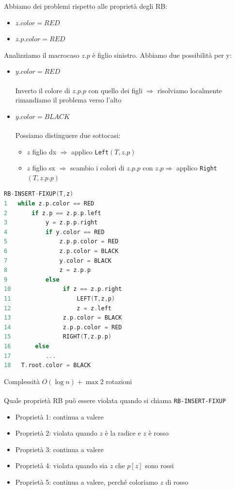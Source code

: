 Abbiamo dei problemi rispetto alle proprietà degli RB:
\begin{itemize}
    \item $z.color = RED$
    \item $z.p.color = RED$
\end{itemize}
Analizziamo il macrocaso $z.p$ è figlio sinistro. Abbiamo due possibilità per y:
\begin{itemize}
    \item $y.color = RED$ \\~\\ Inverto il colore di $z.p.p$ con quello dei figli $\Rightarrow$ risolviamo localmente rimandiamo il problema verso l'alto
    \item $y.color = BLACK$ \\~\\ Possiamo distinguere due sottocasi:
    \begin{itemize}
        \item $z$ figlio dx $\Rightarrow$ applico \verb|Left|$(T,z.p)$
        \item $z$ figlio sx $\Rightarrow$ scambio i colori di $z.p.p$ con $z.p \Rightarrow$ applico \verb|Right|$(T,z.p.p)$
    \end{itemize}
\end{itemize}
\begin{mdframed}
\begin{lstlisting}[language=C]
RB-INSERT-FIXUP(T,z)
1   while z.p.color == RED
2       if z.p == z.p.p.left
3           y = z.p.p.right
4           if y.color == RED
5               z.p.p.color = RED
6               z.p.color = BLACK
7               y.color = BLACK
8               z = z.p.p
9           else
10               if z == z.p.right
11                   LEFT(T,z,p)
12                   z = z.left
13               z.p.color = BLACK
14               z.p.p.color = RED
15               RIGHT(T,z.p.p)
16       else
17          ...
18   T.root.color = BLACK
\end{lstlisting}
\end{mdframed}
Complessità $O(\log n) + \max 2$ rotazioni \\~\\

Quale proprietà RB può essere violata quando si chiama \verb|RB-INSERT-FIXUP|
\begin{itemize}
    \item Proprietà 1: continua a valere
    \item Proprietà 2: violata quando $z$ è la radice e $z$ è rosso
    \item Proprietà 3: continua a valere
    \item Proprietà 4: violata quando sia $z$ che $p[z]$ sono rossi
    \item Proprietà 5: continua a valere, perché coloriamo $z$ di rosso
\end{itemize}

